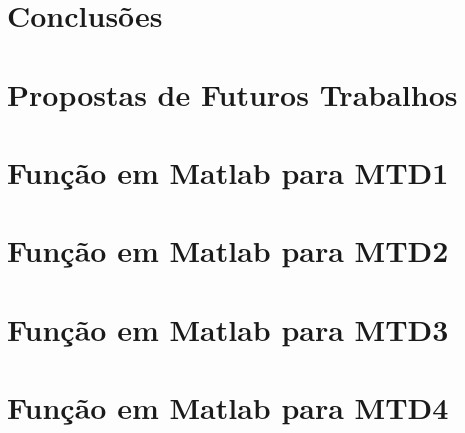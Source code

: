 \documentclass[
	12pt,				%
	openright,			%
	oneside,			%
	a4paper,			%
	english,			%
	francais,			%
	spanish,			%
	brazil				%
	]{abntex2}
\begin{document}
\chapter{Conclusões}

\chapter{Propostas de Futuros Trabalhos}

\postextual
%
%
%
%
%
\begin{apendicesenv}
%
\partapendices
%
\chapter{Função em Matlab para MTD1}
%

%
\chapter{Função em Matlab para MTD2}
%

%
\chapter{Função em Matlab para MTD3}
%

%
\chapter{Função em Matlab para MTD4}
%

%
\end{apendicesenv}
\end{document}
